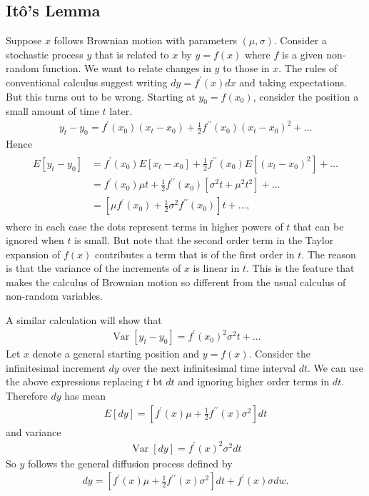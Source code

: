 \documentclass[12pt]{article}
\theoremstyle{definition}
\begin{document}
\subsection{Itô's Lemma}
Suppose $x$ follows Brownian motion with parameters $(\mu, \sigma)$. Consider a stochastic process $y$ that is related to $x$ by $y=f(x)$ where $f$ is a given non-random function. We want to relate changes in $y$ to those in $x$. The rules of conventional calculus suggest writing $d y=f^{\prime}(x) d x$ and taking expectations. But this turns out to be wrong. Starting at $y_{0}=f\left(x_{0}\right)$, consider the position a small amount of time $t$ later.
\begin{align*}
y_{t}-y_{0}=f^{\prime}\left(x_{0}\right)\left(x_{t}-x_{0}\right)+\frac{1}{2} f^{\prime \prime}\left(x_{0}\right)\left(x_{t}-x_{0}\right)^{2}+\ldots
\end{align*}
Hence
\begin{align*}
\begin{aligned}
E\left[y_{t}-y_{0}\right] & =f^{\prime}\left(x_{0}\right) E\left[x_{t}-x_{0}\right]+\frac{1}{2} f^{\prime \prime}\left(x_{0}\right) E\left[\left(x_{t}-x_{0}\right)^{2}\right]+\ldots \\
& =f^{\prime}\left(x_{0}\right) \mu t+\frac{1}{2} f^{\prime \prime}\left(x_{0}\right)\left[\sigma^{2} t+\mu^{2} t^{2}\right]+\ldots \\
& =\left[\mu f^{\prime}\left(x_{0}\right)+\frac{1}{2} \sigma^{2} f^{\prime \prime}\left(x_{0}\right)\right] t+\ldots,
\end{aligned}
\end{align*}
where in each case the dots represent terms in higher powers of $t$ that can be ignored when $t$ is small. But note that the second order term in the Taylor expansion of $f(x)$ contributes a term that is of the first order in $t$. The reason is that the variance of the increments of $x$ is linear in $t$. This is the feature that makes the calculus of Brownian motion so different from the usual calculus of non-random variables.

A similar calculation will show that
\begin{align*}
\operatorname{Var}\left[y_{t}-y_{0}\right]=f^{\prime}\left(x_{0}\right)^{2} \sigma^{2} t+\ldots
\end{align*}
Let $x$ denote a general starting position and $y=f(x)$. Consider the infinitesimal increment $d y$ over the next infinitesimal time interval $dt$. We can use the above expressions replacing $t$ bt $dt$ and ignoring higher order terms in $dt$. Therefore $d y$ has mean
\begin{align*}
E[d y]=\left[f^{\prime}(x) \mu+\frac{1}{2} f^{\prime \prime}(x) \sigma^{2}\right] d t
\end{align*}
and variance
\begin{align*}
\operatorname{Var}[d y]=f^{\prime}(x)^{2} \sigma^{2} d t
\end{align*}
So $y$ follows the general diffusion process defined by
\begin{align}
d y=\left[f^{\prime}(x) \mu+\frac{1}{2} f^{\prime \prime}(x) \sigma^{2}\right] d t+f^{\prime}(x) \sigma d w . \label{1.6}
\end{align}
\end{document}
